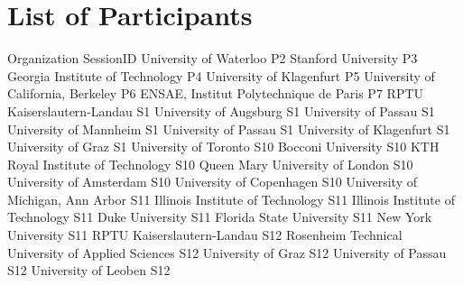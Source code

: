 \chapter{List of Participants}

\setlength{\columnsep}{1cm}

\begin{multicols}{2}

\small\raggedright

{Organization}
{SessionID}
{}
{University of Waterloo}
{P2}
{}
{Stanford University}
{P3}
{}
{Georgia Institute of Technology}
{P4}
{}
{University of Klagenfurt}
{P5}
{}
{University of California, Berkeley}
{P6}
{}
{ENSAE, Institut Polytechnique de Paris}
{P7}
{}
{RPTU Kaiserslautern-Landau}
{S1}
{}
{University of Augsburg}
{S1}
{}
{University of Passau}
{S1}
{}
{University of Mannheim}
{S1}
{}
{University of Passau}
{S1}
{}
{University of Klagenfurt}
{S1}
{}
{University of Graz}
{S1}
{}
{University of Toronto}
{S10}
{}
{Bocconi University}
{S10}
{}
{KTH Royal Institute of Technology}
{S10}
{}
{Queen Mary University of London}
{S10}
{}
{University of Amsterdam}
{S10}
{}
{University of Copenhagen}
{S10}
{}
{University of Michigan, Ann Arbor}
{S11}
{}
{Illinois Institute of Technology}
{S11}
{}
{Illinois Institute of Technology}
{S11}
{}
{Duke University}
{S11}
{}
{Florida State University}
{S11}
{}
{New York University}
{S11}
{}
{RPTU Kaiserslautern-Landau}
{S12}
{}
{Rosenheim Technical University of Applied Sciences}
{S12}
{}
{University of Graz}
{S12}
{}
{University of Passau}
{S12}
{}
{University of Leoben}
{S12}

\end{multicols}
